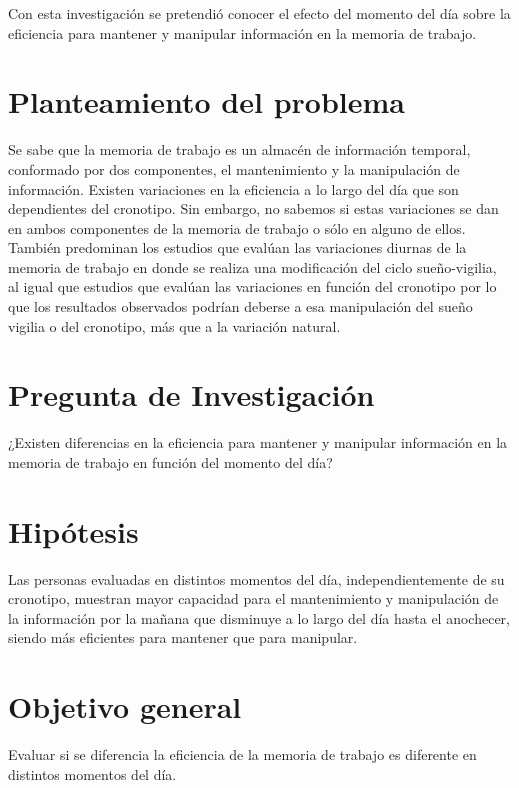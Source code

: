 \documentclass[12pt,letterpaper,final]{article}
\begin{document}
Con esta investigación se pretendió conocer el efecto del momento del día sobre la eficiencia para mantener y manipular información en la memoria de trabajo.

\section{Planteamiento del problema}
Se sabe que la memoria de trabajo es un almacén de información temporal, conformado por dos componentes, el  mantenimiento y la manipulación de información. Existen variaciones en la eficiencia a lo largo del día que son dependientes del cronotipo. Sin embargo, no sabemos si estas variaciones se dan en ambos componentes de la memoria de trabajo o sólo en alguno de ellos. También predominan los estudios que evalúan las variaciones diurnas de la memoria de trabajo en donde se realiza una modificación del ciclo sueño-vigilia, al igual que estudios que evalúan las variaciones en función del cronotipo por lo que los resultados observados podrían deberse a esa manipulación del sueño vigilia o del cronotipo, más que a la variación natural. %

\section{Pregunta de Investigación}
¿Existen diferencias en la eficiencia para mantener y manipular información en la memoria de trabajo en función del momento del día?

\section{Hipótesis}
Las personas evaluadas en distintos momentos del día, independientemente de su cronotipo, muestran mayor capacidad para el mantenimiento y manipulación de la información por la mañana que disminuye a lo largo del día hasta el anochecer, siendo más eficientes para mantener que para manipular.

\section{Objetivo general}
Evaluar si se diferencia la eficiencia de la memoria de trabajo es diferente en distintos momentos del día.
\end{document}

